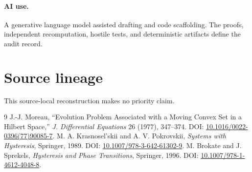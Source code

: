 \documentclass[10pt]{article}
\begin{document}
\paragraph{AI use.}
A generative language model assisted drafting and code scaffolding.  The
proofs, independent recomputation, hostile tests, and deterministic artifacts
define the audit record.
\fi

\section*{Source lineage}
This source-local reconstruction makes no priority claim.
\begin{thebibliography}{9}
J.-J. Moreau, ``Evolution Problem Associated with a Moving Convex Set in a
Hilbert Space,'' \emph{J. Differential Equations} 26 (1977), 347--374.
DOI: \href{https://doi.org/10.1016/0022-0396(77)90085-7}%
{10.1016/0022-0396(77)90085-7}.
M. A. Krasnosel'skii and A. V. Pokrovskii,
\emph{Systems with Hysteresis}, Springer, 1989. DOI:
\href{https://doi.org/10.1007/978-3-642-61302-9}%
{10.1007/978-3-642-61302-9}.
M. Brokate and J. Sprekels, \emph{Hysteresis and Phase Transitions},
Springer, 1996. DOI:
\href{https://doi.org/10.1007/978-1-4612-4048-8}%
{10.1007/978-1-4612-4048-8}.
\end{thebibliography}
\end{document}
